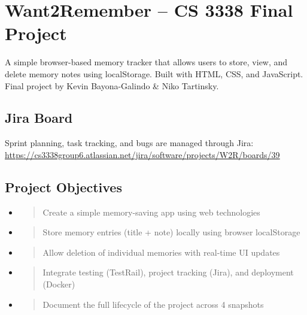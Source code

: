 \documentclass[
]{article}
\author{}
\date{}
\begin{document}
\hypertarget{want2remember-cs-3338-final-project}{%
\section{\texorpdfstring{\textbf{Want2Remember -- CS 3338 Final
Project}}{Want2Remember -- CS 3338 Final Project}}\label{want2remember-cs-3338-final-project}}

A simple browser-based memory tracker that allows users to store, view,
and delete memory notes using localStorage. Built with HTML, CSS, and
JavaScript. Final project by Kevin Bayona-Galindo \& Niko Tartinsky.

\hypertarget{jira-board}{%
\subsection{\texorpdfstring{\textbf{Jira
Board}}{Jira Board}}\label{jira-board}}

Sprint planning, task tracking, and bugs are managed through Jira:\\
\href{https://cs3338group6.atlassian.net/jira/software/projects/W2R/boards/39}{\uline{https://cs3338group6.atlassian.net/jira/software/projects/W2R/boards/39}}

\hypertarget{project-objectives}{%
\subsection{\texorpdfstring{\textbf{Project
Objectives}}{Project Objectives}}\label{project-objectives}}

\begin{itemize}
\item
  \begin{quote}
  Create a simple memory-saving app using web technologies
  \end{quote}
\item
  \begin{quote}
  Store memory entries (title + note) locally using browser localStorage
  \end{quote}
\item
  \begin{quote}
  Allow deletion of individual memories with real-time UI updates
  \end{quote}
\item
  \begin{quote}
  Integrate testing (TestRail), project tracking (Jira), and deployment
  (Docker)
  \end{quote}
\item
  \begin{quote}
  Document the full lifecycle of the project across 4 snapshots
  \end{quote}
\end{itemize}
\end{document}
